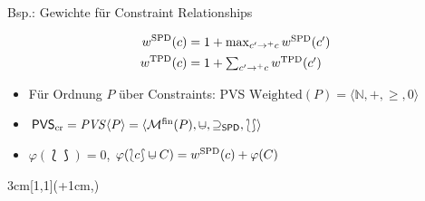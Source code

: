 \begin{frame}{Bsp.: Gewichte für Constraint Relationships}

\bgroup\abovedisplayskip=-16pt\belowdisplayskip=4pt
\begin{align*}
  w^{\mathrm{SPD}}_{}(c) &\textstyle= 1 + \max_{c' \rightarrow^+ c} w^{\mathrm{SPD}}_{}(c') 
\\
  w^{\mathrm{TPD}}_{}(c) &\textstyle= 1 + \sum_{c' \rightarrow^+ c} w^{\mathrm{TPD}}_{}(c')  
\end{align*}
\egroup

\vspace*{1ex} \small \pause 
\begin{itemize}
\item Für Ordnung $P$ über Constraints: PVS $\mathrm{Weighted}(P) = \langle \mathbb{N}, +, \geq, 0 \rangle$
\item $\mathsf{PVS}_{\mathrm{cr}} = \mathit{PVS}\langle P \rangle = \langle \mathcal{M}^{\mathrm{fin}} (P), \mcup, \supseteq_{\mathsf{SPD}}, \lbag \rbag \rangle$
\item $\varphi(\lbag \rbag) = 0$, $\varphi(\lbag c\rbag \mcup C) = \SPDw{}(c) + \varphi(C)$
\end{itemize}



\hfill \cite{Schiendorfer13}
\begin{textblock*}{3cm}[1,1](\textwidth+1cm,\textheight-2.7cm)
\begin{center}
\end{center}
\end{textblock*}
\end{frame}
%
